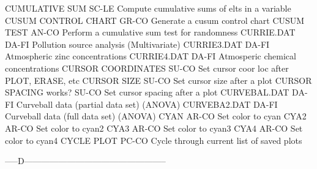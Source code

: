 CUMULATIVE SUM              SC-LE Compute cumulative sums of elts in a variable
CUSUM CONTROL CHART         GR-CO Generate a cusum control chart
CUSUM TEST                  AN-CO Perform a cumulative sum test for randomness
CURRIE.DAT                  DA-FI Pollution source analysis (Multivariate)
CURRIE3.DAT                 DA-FI Atmospheric zinc concentrations
CURRIE4.DAT                 DA-FI Atmosperic chemical concentrations
CURSOR COORDINATES          SU-CO Set cursor coor loc after PLOT, ERASE, etc
CURSOR SIZE                 SU-CO Set cursor size after a plot
CURSOR SPACING works?       SU-CO Set cursor spacing after a plot
CURVEBAL.DAT                DA-FI Curveball data (partial data set) (ANOVA)
CURVEBA2.DAT                DA-FI Curveball data (full data set) (ANOVA)
CYAN                        AR-CO Set color to cyan
CYA2                        AR-CO Set color to cyan2
CYA3                        AR-CO Set color to cyan3
CYA4                        AR-CO Set color to cyan4
CYCLE PLOT                  PC-CO Cycle through current list of saved plots

-----D--------------------------------------------------

